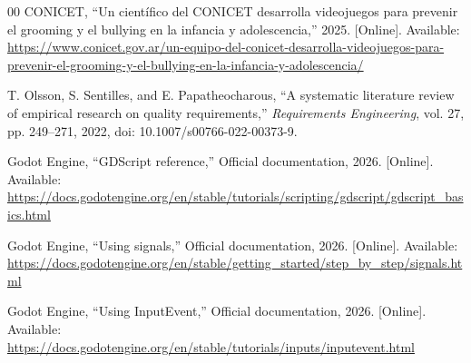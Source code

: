 \documentclass[conference]{IEEEtran}
\begin{document}
\begin{thebibliography}{00}
CONICET, ``Un científico del CONICET desarrolla videojuegos para prevenir el grooming y el bullying en la infancia y adolescencia,'' 2025. [Online]. Available: \url{https://www.conicet.gov.ar/un-equipo-del-conicet-desarrolla-videojuegos-para-prevenir-el-grooming-y-el-bullying-en-la-infancia-y-adolescencia/}

T. Olsson, S. Sentilles, and E. Papatheocharous, ``A systematic literature review of empirical research on quality requirements,'' \textit{Requirements Engineering}, vol. 27, pp. 249--271, 2022, doi: 10.1007/s00766-022-00373-9.

Godot Engine, ``GDScript reference,'' Official documentation, 2026. [Online]. Available: \url{https://docs.godotengine.org/en/stable/tutorials/scripting/gdscript/gdscript_basics.html}

Godot Engine, ``Using signals,'' Official documentation, 2026. [Online]. Available: \url{https://docs.godotengine.org/en/stable/getting_started/step_by_step/signals.html}

Godot Engine, ``Using InputEvent,'' Official documentation, 2026. [Online]. Available: \url{https://docs.godotengine.org/en/stable/tutorials/inputs/inputevent.html}

\end{thebibliography}
\endgroup
\end{document}
